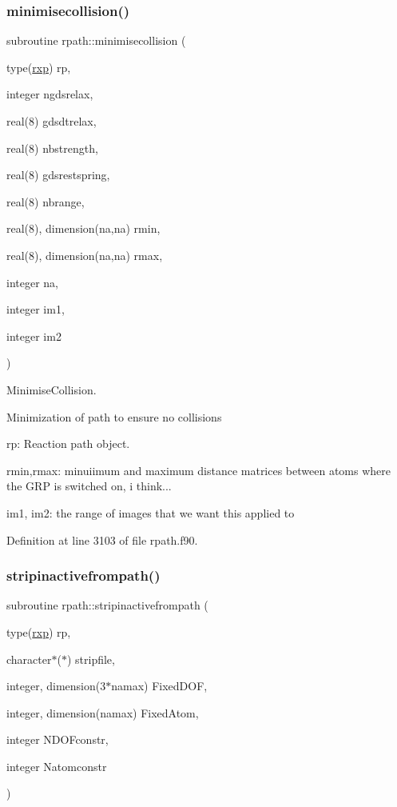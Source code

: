 \subsubsection{\texorpdfstring{minimisecollision()}{minimisecollision()}}
{\footnotesize\ttfamily subroutine rpath\+::minimisecollision (\begin{DoxyParamCaption}\item[{type(\mbox{\hyperlink{structrpath_1_1rxp}{rxp}})}]{rp,  }\item[{integer}]{ngdsrelax,  }\item[{real(8)}]{gdsdtrelax,  }\item[{real(8)}]{nbstrength,  }\item[{real(8)}]{gdsrestspring,  }\item[{real(8)}]{nbrange,  }\item[{real(8), dimension(na,na)}]{rmin,  }\item[{real(8), dimension(na,na)}]{rmax,  }\item[{integer}]{na,  }\item[{integer}]{im1,  }\item[{integer}]{im2 }\end{DoxyParamCaption})}



Minimise\+Collision. 

Minimization of path to ensure no collisions


\begin{DoxyItemize}
\item rp\+: Reaction path object.
\item rmin,rmax\+: minuiimum and maximum distance matrices between atoms where the G\+RP is switched on, i think...
\item im1, im2\+: the range of images that we want this applied to 
\end{DoxyItemize}

Definition at line 3103 of file rpath.\+f90.

\mbox{\label{namespacerpath_aa844bacf78aac643d982ebb18988dbb6}} 
\subsubsection{\texorpdfstring{stripinactivefrompath()}{stripinactivefrompath()}}
{\footnotesize\ttfamily subroutine rpath\+::stripinactivefrompath (\begin{DoxyParamCaption}\item[{type(\mbox{\hyperlink{structrpath_1_1rxp}{rxp}})}]{rp,  }\item[{character$\ast$($\ast$)}]{stripfile,  }\item[{integer, dimension(3$\ast$namax)}]{Fixed\+D\+OF,  }\item[{integer, dimension(namax)}]{Fixed\+Atom,  }\item[{integer}]{N\+D\+O\+Fconstr,  }\item[{integer}]{Natomconstr }\end{DoxyParamCaption})}



